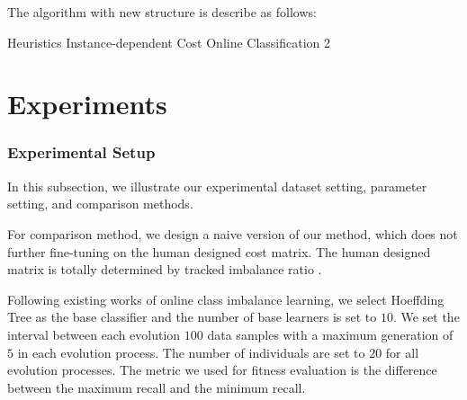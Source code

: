 \documentclass{article}
\begin{document}
The algorithm with new structure is describe as follows:

\begin{algorithm}
	\caption{Heuristics Instance-dependent Cost Online Classification 2}
\end{algorithm}



\section{Experiments}
\subsubsection{Experimental Setup}
In this subsection, we illustrate our experimental dataset setting, parameter setting, and comparison methods.

For comparison method, we design a naive version of our method, which does not further fine-tuning on the human designed cost matrix. The human designed matrix is totally determined by tracked imbalance ratio .

Following existing works of online class imbalance learning, we select Hoeffding Tree  as the base classifier and the number of base learners is set to $10$. We set the interval between each evolution $100$ data samples with a maximum generation of $5$ in each evolution process. The number of individuals are set to $20$ for all evolution processes. The metric we used for fitness evaluation is the difference between the maximum recall and the minimum recall.
\end{document}
